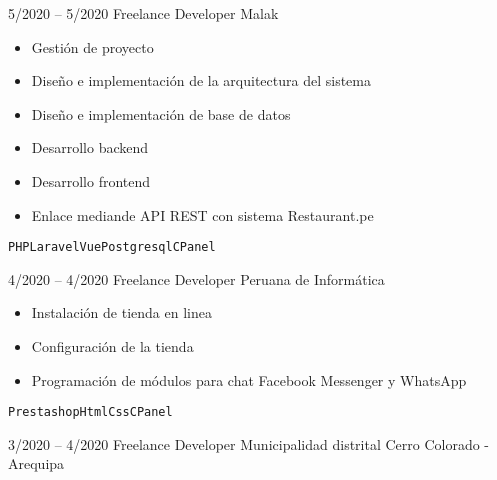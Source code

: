 
\begin{entrylist}
    \entry
		{5/2020 -- 5/2020}
		{Freelance Developer}
		{Malak}
		{
		    \vspace{-5mm}
    	    \begin{itemize}
    	        \setlength\itemsep{0pt}
    	        \setlength\parskip{0pt}
    	        \item Gestión de proyecto
    	        \item Diseño e implementación de la arquitectura del sistema
    	        \item Diseño e implementación de base de datos
    	        \item Desarrollo backend
    	        \item Desarrollo frontend
    	        \item Enlace mediande API REST con sistema Restaurant.pe
    	    \end{itemize}\texttt{PHP}\slashsep\texttt{Laravel}\slashsep\texttt{Vue}\slashsep\texttt{Postgresql}\slashsep\texttt{CPanel}
        }
	\entry
		{4/2020 -- 4/2020}
		{Freelance Developer}
		{Peruana de Informática}
		{
		    \vspace{-5mm}
    	    \begin{itemize}
    	        \setlength\itemsep{0pt}
    	        \setlength\parskip{0pt}
    	        \item Instalación de tienda en linea
    	        \item Configuración de la tienda
    	        \item Programación de módulos para chat Facebook Messenger y WhatsApp
    	    \end{itemize}
		    \texttt{Prestashop}\slashsep\texttt{Html}\slashsep\texttt{Css}\slashsep\texttt{CPanel}
        }
	\entry
		{3/2020 -- 4/2020}
		{Freelance Developer}
		{Municipalidad distrital Cerro Colorado - Arequipa}
		{
		    \vspace{-5mm}
    	    \begin{itemize}
    	        \setlength\itemsep{0pt}
    	        \setlength\parskip{0pt}

\end{itemize}}
\end{entrylist}
